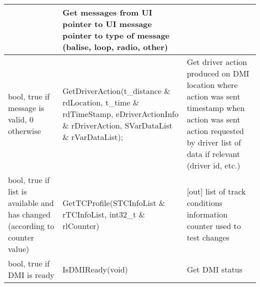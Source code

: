 \documentclass{template/openetcs_article}
\begin{document}
\begin{longtable}{|l|l|l|}
	&	\begin{minipage}[t]{0.35\linewidth} Get messages from UI
	\newline [out] pointer to UI message
	\newline [out] pointer to type of message (balise, loop, radio, other) \end{minipage} \\
	\hline
		\begin{minipage}[t]{0.35\linewidth} bool, true if message is valid, 0 otherwise \end{minipage} 
	&	\begin{minipage}[t]{0.35\linewidth} GetDriverAction(t\_distance \& rdLocation, t\_time \& rdTimeStamp, eDriverActionInfo \&  rDriverAction, SVarDataList \& rVarDataList); \end{minipage} 
	&	\begin{minipage}[t]{0.35\linewidth} Get driver action produced on DMI
	\newline [out] location where action was sent
	\newline [out] timestamp when action was sent
	\newline [out] action requested by driver
	\newline [out] list of data if relevant (driver id, etc.) \end{minipage} \\
	\hline
		\begin{minipage}[t]{0.35\linewidth} bool, true if list is available and has changed (according to counter value) \end{minipage} 
	&	\begin{minipage}[t]{0.35\linewidth} GetTCProfile(STCInfoList \& rTCInfoList, int32\_t \& rlCounter) \end{minipage} 
	&	\begin{minipage}[t]{0.35\linewidth} [out] list of track conditions information
	\newline [in/out] counter used to test changes \end{minipage} \\
	\hline
		\begin{minipage}[t]{0.35\linewidth} bool, true if DMI is ready \end{minipage} 
	&	\begin{minipage}[t]{0.35\linewidth} IsDMIReady(void) \end{minipage} 
	&	\begin{minipage}[t]{0.35\linewidth} Get DMI status \end{minipage} \\
	\hline
\end{longtable}
\end{document}
